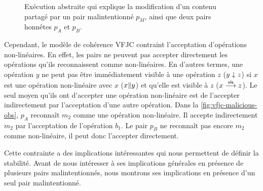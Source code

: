\begin{figure}[htb]
\centering
{}
\caption[Opérations non-linéaires]{Exécution abstraite qui explique la modification d'un contenu partagé par un pair malintentionné $p_M$, ainsi que deux pairs honnêtes $p_A$ et $p_B$.}\label{fig:vfjc-malicious-obs}
\end{figure}

Cependant, le modèle de cohérence \acl{VFJC} contraint l'acceptation d'opérations non-linéaires.
En effet, les pairs ne peuvent pas accepter directement les opérations qu'ils reconnaissent comme non-linéaires.
En d'autres termes, une opération $y$ ne peut pas être immédiatement visible à une opération $z$ ($y \downarrow z$) si $x$ est une opération non-linéaire avec $x$ ($x \| y$) et qu'elle est visible à $z$ ($x \overset{\mathsf{vis}}{\longrightarrow} z$).
Le seul moyen qu'ils ont d'accepter une opération non-linéaire est de l'accepter indirectement par l'acceptation d'une autre opération.
Dans la \autoref{fig:vfjc-malicious-obs}, $p_A$ reconnaît $m_2$ comme une opération non-linéaire.
Il accepte indirectement $m_2$ par l'acceptation de l'opération $b_1$.
Le pair $p_B$ ne reconnaît pas encore $m_2$ comme non-linéaire, il peut donc l'accepter directement.

Cette contrainte a des implications intéressantes qui nous permettent de définir la stabilité.
Avant de nous intéresser à ses implications générales en présence de plusieurs pairs malintentionnés, nous montrons ses implications en présence d'un seul pair malintentionné.

